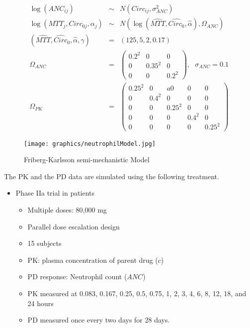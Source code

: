 \documentclass[11pt]{amsart}
\begin{document}
\begin{eqnarray*}
\log(ANC_{ij}) &\sim& N(Circ_{ij}, \sigma^2_{ANC}) \\
\log\left(MTT_j, Circ_{0j}, \alpha_j\right) &\sim& N\left(\log\left(\widehat{MTT}, \widehat{Circ_0}, \widehat{\alpha}\right), \Omega_{ANC}\right) \\
\left(\widehat{MTT}, \widehat{Circ}_0,\widehat{\alpha}, \gamma \right) &=& \left(125, 5, 2, 0.17\right) \\
\Omega_{ANC} &=& \left(\begin{array}{ccc} 0.2^2 & 0 & 0 \\ 0 & 0.35^2 & 0 \\ 0 & 0 & 0.2^2 \end{array}\right), \ \ \ \sigma_{ANC} = 0.1 \\
\Omega_{PK} &=& \left(\begin{array}{ccccc} 0.25^2 & 0 &a 0 & 0 & 0 \\ 0 & 0.4^2 & 0 & 0 & 0 \\
0 & 0 & 0.25^2 & 0 & 0 \\ 0 & 0 & 0 & 0.4^2 & 0 \\ 0 & 0 & 0 & 0 & 0.25^2  \end{array}\right)
\end{eqnarray*}

\begin{figure}[htbp]
\texttt{[image: graphics/neutrophilModel.jpg]}
\caption{Friberg-Karlsson semi-mechanistic Model \cite{2364}}
\label{FK}
\end{figure}

The PK and the PD data are simulated using the following treatment.
\begin{itemize}
  \item Phase IIa trial in patients
  \begin{itemize}
    \item Multiple doses: 80,000 mg
    \item Parallel dose escalation design
    \item 15 subjects
    \item PK: plasma concentration of parent drug ($c$)
    \item PD response: Neutrophil count ($ANC$)
    \item PK measured at 0.083, 0.167, 0.25, 0.5, 0.75, 1, 2, 3, 4, 6, 8, 12, 18, and 24 hours
    \item PD measured once every two days for 28 days.
  \end{itemize}
\end{itemize}
\end{document}
